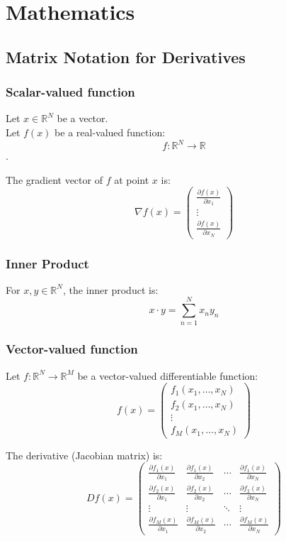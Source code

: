 \chapter{Mathematics}

\section{Matrix Notation for Derivatives}



\subsection*{Scalar-valued function}
Let $x \in \mathbb{R}^N$ be a vector.\\
Let $f(x)$ be a real-valued function:
\[
f : \mathbb{R}^N \to \mathbb{R}
\].


The gradient vector of $f$ at point $x$ is:
\[
\nabla f(x) =
\begin{pmatrix}
\frac{\partial f(x)}{\partial x_1} \\
\vdots \\
\frac{\partial f(x)}{\partial x_N}
\end{pmatrix}
\]


\subsection*{Inner Product}
For $x, y \in \mathbb{R}^N$, the inner product is:
\[
x \cdot y = \sum_{n=1}^N x_n y_n
\]

\subsection*{Vector-valued function}
Let $f : \mathbb{R}^N \to \mathbb{R}^M$ be a vector-valued differentiable function:
\[
f(x) =
\begin{pmatrix}
f_1(x_1, \dots, x_N) \\
f_2(x_1, \dots, x_N) \\
\vdots \\
f_M(x_1, \dots, x_N)
\end{pmatrix}
\]

The derivative (Jacobian matrix) is:
\[
Df(x) =
\begin{pmatrix}
\frac{\partial f_1(x)}{\partial x_1} & \frac{\partial f_1(x)}{\partial x_2} & \cdots & \frac{\partial f_1(x)}{\partial x_N} \\
\frac{\partial f_2(x)}{\partial x_1} & \frac{\partial f_2(x)}{\partial x_2} & \cdots & \frac{\partial f_2(x)}{\partial x_N} \\
\vdots & \vdots & \ddots & \vdots \\
\frac{\partial f_M(x)}{\partial x_1} & \frac{\partial f_M(x)}{\partial x_2} & \cdots & \frac{\partial f_M(x)}{\partial x_N}
\end{pmatrix}
\]



